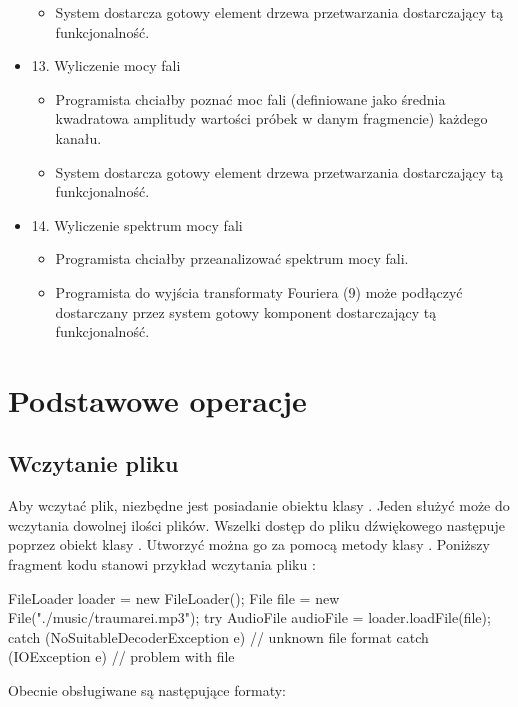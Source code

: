 \begin{itemize}
\begin{itemize}
		\item System dostarcza gotowy element drzewa przetwarzania dostarczający tą funkcjonalność.
	\end{itemize}
	\item 13. Wyliczenie mocy fali
	\begin{itemize}
		\item Programista chciałby poznać moc fali (definiowane jako średnia kwadratowa amplitudy wartości próbek w danym fragmencie) każdego kanału.
		\item System dostarcza gotowy element drzewa przetwarzania dostarczający tą funkcjonalność.
	\end{itemize}
	\item 14. Wyliczenie spektrum mocy fali
	\begin{itemize}
		\item Programista chciałby przeanalizować spektrum mocy fali.
		\item Programista do wyjścia transformaty Fouriera (9) może podłączyć dostarczany przez system gotowy komponent dostarczający tą funkcjonalność.
	\end{itemize}
\end{itemize}
\chapter{Podstawowe operacje}

\section{Wczytanie pliku}

Aby wczytać plik, niezbędne jest posiadanie obiektu klasy . Jeden 
służyć może do wczytania dowolnej ilości plików. Wszelki dostęp do pliku dźwiękowego następuje
poprzez obiekt klasy . Utworzyć można go za pomocą metody 
klasy .  Poniższy fragment kodu stanowi przykład wczytania pliku
:

\begin{java}
FileLoader loader = new FileLoader();
File file = new File("./music/traumarei.mp3");
try {
    AudioFile audioFile = loader.loadFile(file);
} catch (NoSuitableDecoderException e) {
    // unknown file format
} catch (IOException e) {
    // problem with file
}
\end{java}

Obecnie obsługiwane są następujące formaty:


